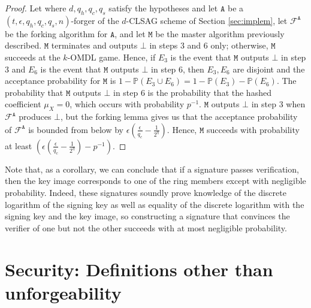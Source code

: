 \documentclass{mrl}
\theoremstyle{plain}
\theoremstyle{definition}
\begin{document}
\begin{proof}
Let where $d, q_h, q_c, q_s$ satisfy the hypotheses and let $\texttt{A}$ be a $(t, \epsilon, q_h, q_c, q_s, n)$-forger of the $d$-CLSAG scheme of Section \ref{sec:implem}, let $\mathcal{F}^{\texttt{A}}$ be the forking algorithm for $\texttt{A}$, and let $\texttt{M}$ be the master algorithm previously described. $\texttt{M}$ terminates and outputs $\bot$ in steps $3$ and $6$ only; otherwise, $\texttt{M}$ succeeds at the $k$-OMDL game. Hence, if $E_3$ is the event that $\texttt{M}$ outputs $\bot$ in step $3$ and $E_6$ is the event that $\texttt{M}$ outputs $\bot$ in step $6$, then $E_3, E_6$ are disjoint and the acceptance probability for $\texttt{M}$ is $1 - \mathbb{P}(E_3 \cup E_6) =  1 - \mathbb{P}(E_3) - \mathbb{P}(E_6)$. The probability that $\texttt{M}$ outputs $\bot$ in step $6$ is the probability that the hashed coefficient $\mu_X = 0$, which occurs with probability $p^{-1}$.  $\texttt{M}$ outputs $\bot$ in step $3$ when $\mathcal{F}^{\texttt{A}}$ produces $\bot$, but the forking lemma gives us that the acceptance probability of $\mathcal{F}^\texttt{A}$ is bounded from below by $\epsilon\left(\frac{\epsilon}{q_c} - \frac{1}{2^\eta}\right)$. Hence, $\texttt{M}$ succeeds with probability at least $ \left(\epsilon\left(\frac{\epsilon}{q_c} - \frac{1}{2^\eta}\right) - p^{-1}\right)$.
\end{proof}

Note that, as a corollary, we can conclude that if a signature passes verification, then the key image corresponds to one of the ring members except with negligible probability. Indeed, these signatures soundly prove knowledge of the discrete logarithm of the signing key as well as equality of the discrete logarithm with the signing key and the key image, so constructing a signature that convinces the verifier of one but not the other succeeds with at most negligible probability.


\section{Security: Definitions other than unforgeability}\label{app:link-and-sa}
\end{document}
